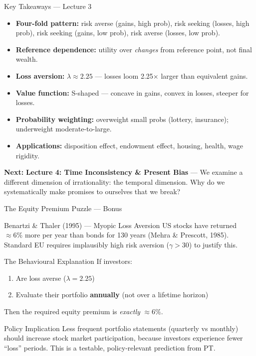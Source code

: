 \documentclass[aspectratio=169]{beamer}
\begin{document}
\begin{frame}{Key Takeaways --- Lecture 3}
\begin{itemize}
  \item[\textcolor{beteal}{\checkmark}] \textbf{Four-fold pattern:} risk averse (gains, high prob), risk seeking (losses, high prob), risk seeking (gains, low prob), risk averse (losses, low prob).
  \item[\textcolor{beteal}{\checkmark}] \textbf{Reference dependence:} utility over \textit{changes} from reference point, not final wealth.
  \item[\textcolor{beteal}{\checkmark}] \textbf{Loss aversion:} $\lambda \approx 2.25$ --- losses loom 2.25$\times$ larger than equivalent gains.
  \item[\textcolor{beteal}{\checkmark}] \textbf{Value function:} S-shaped --- concave in gains, convex in losses, steeper for losses.
  \item[\textcolor{beteal}{\checkmark}] \textbf{Probability weighting:} overweight small probs (lottery, insurance); underweight moderate-to-large.
  \item[\textcolor{beteal}{\checkmark}] \textbf{Applications:} disposition effect, endowment effect, housing, health, wage rigidity.
\end{itemize}
\medskip\textcolor{beblue}{\textbf{Next:}} \textbf{Lecture 4: Time Inconsistency \& Present Bias} --- We examine a different dimension of irrationality: the temporal dimension. Why do we systematically make promises to ourselves that we break?
\end{frame}

\begin{frame}{The Equity Premium Puzzle --- Bonus}
\begin{block}{Benartzi \& Thaler (1995) --- Myopic Loss Aversion}
US stocks have returned $\approx 6\%$ more per year than bonds for 130 years (Mehra \& Prescott, 1985). Standard EU requires implausibly high risk aversion ($\gamma > 30$) to justify this.
\end{block}
\begin{exampleblock}{The Behavioural Explanation}
If investors:
\begin{enumerate}
  \item Are loss averse ($\lambda = 2.25$)
  \item Evaluate their portfolio \textbf{annually} (not over a lifetime horizon)
\end{enumerate}
Then the required equity premium is \textit{exactly} $\approx 6\%$.
\end{exampleblock}
\begin{alertblock}{Policy Implication}
Less frequent portfolio statements (quarterly vs monthly) should increase stock market participation, because investors experience fewer ``loss'' periods. This is a testable, policy-relevant prediction from PT.
\end{alertblock}
\end{frame}
\end{document}
